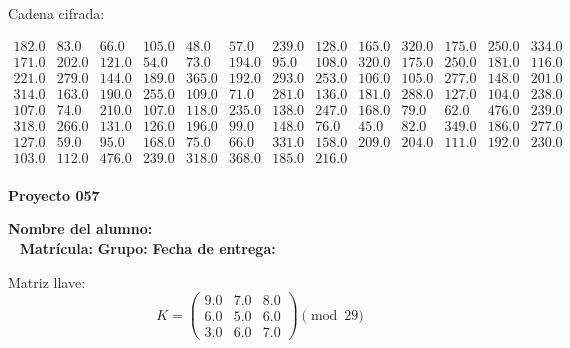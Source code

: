 \documentclass[12pt]{article}
\begin{document}
Cadena cifrada:
\begin{center}
$\begin{array}{lllllllllllll}
182.0 & 83.0 & 66.0 & 105.0 & 48.0 & 57.0 & 239.0 & 128.0 & 165.0 & 320.0 & 175.0 & 250.0 & 334.0\\
171.0 & 202.0 & 121.0 & 54.0 & 73.0 & 194.0 & 95.0 & 108.0 & 320.0 & 175.0 & 250.0 & 181.0 & 116.0\\
221.0 & 279.0 & 144.0 & 189.0 & 365.0 & 192.0 & 293.0 & 253.0 & 106.0 & 105.0 & 277.0 & 148.0 & 201.0\\
314.0 & 163.0 & 190.0 & 255.0 & 109.0 & 71.0 & 281.0 & 136.0 & 181.0 & 288.0 & 127.0 & 104.0 & 238.0\\
107.0 & 74.0 & 210.0 & 107.0 & 118.0 & 235.0 & 138.0 & 247.0 & 168.0 & 79.0 & 62.0 & 476.0 & 239.0\\
318.0 & 266.0 & 131.0 & 126.0 & 196.0 & 99.0 & 148.0 & 76.0 & 45.0 & 82.0 & 349.0 & 186.0 & 277.0\\
127.0 & 59.0 & 95.0 & 168.0 & 75.0 & 66.0 & 331.0 & 158.0 & 209.0 & 204.0 & 111.0 & 192.0 & 230.0\\
103.0 & 112.0 & 476.0 & 239.0 & 318.0 & 368.0 & 185.0 & 216.0\\
\end{array}$
\end{center}

\newpage


\textbf{Proyecto 057}

\textbf{Nombre del alumno:} \underline{\hspace{13cm}}\\\
\vspace{1cm}
\textbf{Matrícula:} \underline{\hspace{4cm}} \hspace{1cm}
\textbf{Grupo:} \underline{\hspace{2cm}}
\textbf{Fecha de entrega:} \underline{\hspace{2cm}}

\medskip

Matriz llave:
\[
K = \begin{pmatrix}
9.0 & 7.0 & 8.0\\
6.0 & 5.0 & 6.0\\
3.0 & 6.0 & 7.0
\end{pmatrix} \pmod{29}
\]
\end{document}
